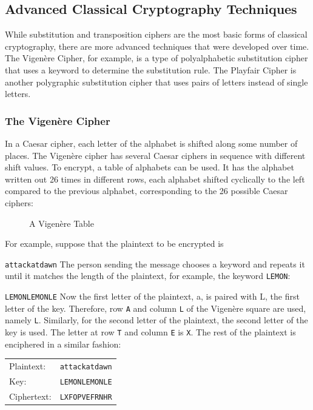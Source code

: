 \documentclass[11pt,a4paper]{report}
\begin{document}
\subsection{Advanced Classical Cryptography Techniques}

While substitution and transposition ciphers are the most basic forms of classical cryptography, there are more advanced techniques that were developed over time.
The Vigen\`ere Cipher, for example, is a type of polyalphabetic substitution cipher that uses a keyword to determine the substitution rule.
The Playfair Cipher is another polygraphic substitution cipher that uses pairs of letters instead of single letters.
\subsubsection{The Vigen\`ere Cipher}

In a Caesar cipher, each letter of the alphabet is shifted along some number of places.
The Vigen\`ere cipher has several Caesar ciphers in sequence with different shift values.
To encrypt, a table of alphabets can be used. It has the alphabet written out 26 times in different rows, each alphabet shifted cyclically to the left compared to the previous alphabet, corresponding to the 26 possible Caesar ciphers:
\begin{figure}[h]
\caption{A Vigen\`ere Table}
\end{figure}

For example, suppose that the plaintext to be encrypted is

\verb|attackatdawn|
The person sending the message chooses a keyword and repeats it until it matches the length of the plaintext, for example, the keyword \verb|LEMON|:


\verb|LEMONLEMONLE|
Now the first letter of the plaintext, a, is paired with L, the first letter of the key.
Therefore, row \verb|A| and column \verb|L| of the Vigen\`ere square are used, namely \verb|L|.
Similarly, for the second letter of the plaintext, the second letter of the key is used.
The letter at row \verb|T| and column \verb|E| is \verb|X|.
The rest of the plaintext is enciphered in a similar fashion:
\begin{center}
\begin{tabular}{ll}
Plaintext: & 	\verb|attackatdawn| \\
Key: & 	\verb|LEMONLEMONLE| \\
Ciphertext:	 & \verb|LXFOPVEFRNHR|
\end{tabular}
\end{center}
\end{document}
